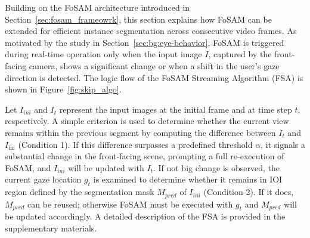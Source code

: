 \documentclass{article}
\begin{document}
Building on the FoSAM architecture introduced in Section~\ref{sec:fosam_frameowrk}, this section explains how FoSAM can be extended for efficient instance segmentation across consecutive video frames. As motivated by the study in Section~\ref{sec:bg:eye-behavior}, FoSAM is triggered during real-time operation only when the input image $I$, captured by the front-facing camera, shows a significant change or when a shift in the user's gaze direction is detected. The logic flow of the FoSAM Streaming Algorithm (FSA) is shown in Figure~\ref{fig:skip_algo}.

 
Let $I_{ini}$ and $I_{t}$ represent the input images at the initial frame and at time step $t$, respectively. A simple criterion is used to determine whether the current view remains within the previous segment by computing the difference between $I_{t}$ and $I_{\text{ini}}$ (Condition 1). If this difference surpasses a predefined threshold $\alpha$, it signals a substantial change in the front-facing scene, prompting a full re-execution of FoSAM, and $I_{ini}$ will be updated with $I_{t}$. If not big change is observed, the current gaze location $g_t$ is examined to determine whether it remains in IOI region defined by the segmentation mask $M_{pred}$ of $I_{ini}$ (Condition 2). If it does, $M_{pred}$ can be reused; otherwise FoSAM must be executed with $g_t$ and $M_{pred}$ will be updated accordingly. A detailed description of the FSA is provided in the supplementary materials.
\end{document}
